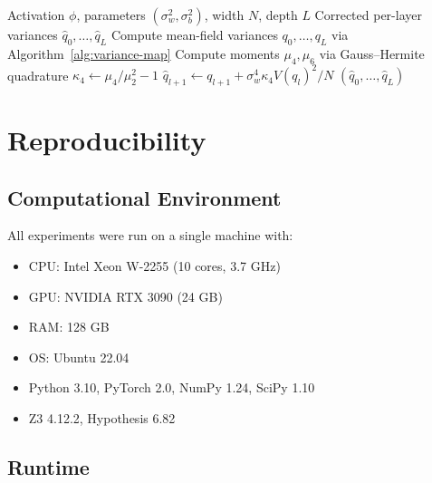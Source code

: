 \documentclass[10pt]{article}
\begin{document}
\begin{algorithm}[H]
\caption{Finite-Width Corrected Variance}
\label{alg:finite-width}
\begin{algorithmic}[1]
\Require Activation $\phi$, parameters $(\sigma_w^2, \sigma_b^2)$, width $N$, depth $L$
\Ensure Corrected per-layer variances $\hat{q}_0, \ldots, \hat{q}_L$
\State Compute mean-field variances $q_0, \ldots, q_L$ via Algorithm~\ref{alg:variance-map}
\State Compute moments $\mu_4, \mu_6$ via Gauss--Hermite quadrature
\State $\kappa_4 \gets \mu_4/\mu_2^2 - 1$
    \State $\hat{q}_{l+1} \gets q_{l+1} + \sigma_w^4 \kappa_4 V(q_l)^2 / N$
\EndFor
\State \Return $(\hat{q}_0, \ldots, \hat{q}_L)$
\end{algorithmic}
\end{algorithm}

\section{Reproducibility}
\label{app:reproducibility}

\subsection{Computational Environment}

All experiments were run on a single machine with:
\begin{itemize}[nosep]
    \item CPU: Intel Xeon W-2255 (10 cores, 3.7 GHz)
    \item GPU: NVIDIA RTX 3090 (24 GB)
    \item RAM: 128 GB
    \item OS: Ubuntu 22.04
    \item Python 3.10, PyTorch 2.0, NumPy 1.24, SciPy 1.10
    \item Z3 4.12.2, Hypothesis 6.82
\end{itemize}

\subsection{Runtime}
\end{document}
